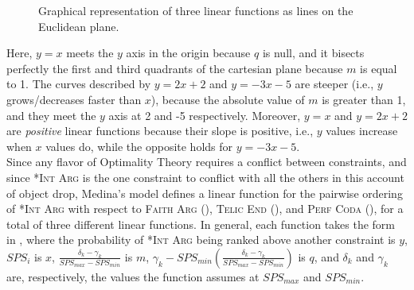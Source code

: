 \begin{figure}[htb]
\caption{Graphical representation of three linear functions as lines on the Euclidean plane.}
\end{figure}

Here, $y = x$ meets the $y$ axis in the origin because $q$ is null, and it bisects perfectly the first and third quadrants of the cartesian plane because $m$ is equal to 1. The curves described by $y = 2x + 2$ and $y = -3x - 5$ are steeper (i.e., $y$ grows/decreases faster than $x$), because the absolute value of $m$ is greater than 1, and they meet the $y$ axis at 2 and -5 respectively. Moreover, $y = x$ and $y = 2x + 2$ are \textit{positive} linear functions because their slope is positive, i.e., $y$ values increase when $x$ values do, while the opposite holds for $y = -3x - 5$.\\
Since any flavor of Optimality Theory requires a conflict between constraints, and since \textsc{*Int Arg} is the one constraint to conflict with all the others in this account of object drop, Medina's model defines a linear function for the pairwise ordering of \textsc{*Int Arg} with respect to \textsc{Faith Arg} (), \textsc{Telic End} (), and \textsc{Perf Coda} (), for a total of three different linear functions. In general, each function takes the form in , where the probability of \textsc{*Int Arg} being ranked above another constraint is $y$, $SPS_i$ is $x$, $\frac{\delta_k - \gamma_k}{SPS_{max} - SPS_{min}}$ is $m$, $\gamma_k - SPS_{min} (\frac{\delta_k - \gamma_k}{SPS_{max} - SPS_{min}})$ is $q$, and $\delta_k$ and $\gamma_k$ are, respectively, the values the function assumes at $SPS_{max}$ and $SPS_{min}$.


